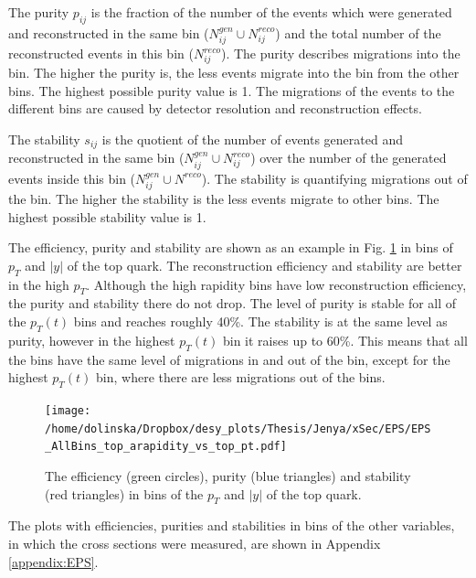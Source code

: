 The purity $p_{ij}$ is the fraction of the number of the events which were generated and reconstructed in the same bin ($N_{ij}^{gen} \cup N_{ij}^{reco}$)
and the total number of the reconstructed events in this bin ($N_{ij}^{reco}$). The purity describes migrations into the bin.
The higher the purity is, the less events migrate into the bin from the other bins. The highest possible purity value is 1.
The migrations of the events to the different bins are caused by detector resolution and reconstruction effects.

The stability $s_{ij}$ is the quotient of the number of events generated and reconstructed in the same bin ($N_{ij}^{gen} \cup N_{ij}^{reco}$) over the 
number of the generated events inside this bin ($N_{ij}^{gen} \cup N^{reco}$). The stability is quantifying migrations out of the bin. The higher 
the stability is the less events migrate to other bins. The highest possible stability value is 1.

The efficiency, purity and stability are shown as an example in Fig. \ref{fig:EPS_2D_y_pt} in bins of $p_{T}$ and $|y|$ of the top quark. The 
reconstruction efficiency and stability are better in the high $p_{T}$. Although the high rapidity bins have low reconstruction efficiency, 
the purity and stability there do not drop. The level of purity is stable for all of the $p_{T}(t)$ bins and reaches roughly 40\%. The 
stability is at the same level as purity, however in the highest $p_{T}(t)$ bin it raises up to 60\%. This means that all the bins have the 
same level of migrations in and out of the bin, except for the highest $p_{T}(t)$ bin, where there are less migrations out of the bins.

\begin{figure}[t]
  \centering
  \texttt{[image: /home/dolinska/Dropbox/desy\_plots/Thesis/Jenya/xSec/EPS/EPS\_AllBins\_top\_arapidity\_vs\_top\_pt.pdf]}
  \caption{The efficiency (green circles), purity (blue triangles) and stability (red triangles) in bins of the $p_{T}$ and $|y|$ of the top quark.}
  \label{fig:EPS_2D_y_pt}
\end{figure}

The plots with efficiencies, purities and stabilities in bins of the other variables, in which the cross sections were measured, are shown in Appendix \ref{appendix:EPS}.
